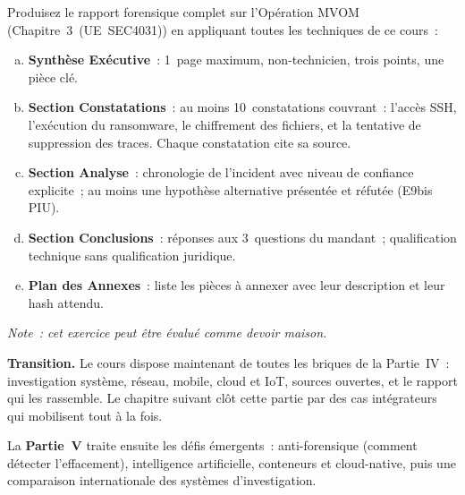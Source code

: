 \begin{boxexo}[title={\ding{45}\quad Exercice~20.3. Rapport complet \niveauexpert}]
Produisez le rapport forensique complet sur l'Opération MVOM
(Chapitre~3~(UE~SEC4031)) en appliquant toutes les
techniques de ce cours~:
\begin{enumerate}[(a)]
    \item \textbf{Synthèse Exécutive}~: 1~page maximum,
          non-technicien, trois points, une pièce clé.
    \item \textbf{Section Constatations}~: au moins 10~constatations
          couvrant~: l'accès SSH, l'exécution du ransomware,
          le chiffrement des fichiers, et la tentative de suppression
          des traces. Chaque constatation cite sa source.
    \item \textbf{Section Analyse}~: chronologie de l'incident avec
          niveau de confiance explicite~; au moins une hypothèse
          alternative présentée et réfutée (E9bis PIU).
    \item \textbf{Section Conclusions}~: réponses aux 3~questions
          du mandant~; qualification technique sans qualification
          juridique.
    \item \textbf{Plan des Annexes}~: liste les pièces à annexer
          avec leur description et leur hash attendu.
\end{enumerate}
\textit{Note~: cet exercice peut être évalué comme devoir maison.}
\end{boxexo}

\bigskip

\begin{boxinfo}
\textbf{Transition.} Le cours dispose maintenant de toutes les
briques de la Partie~IV~: investigation système, réseau, mobile,
cloud et IoT, sources ouvertes, et le rapport qui les rassemble.
Le chapitre suivant clôt cette partie par des cas intégrateurs qui
mobilisent tout à la fois.

La \textbf{Partie~V} traite ensuite les défis émergents~:
anti-forensique (comment détecter l'effacement), intelligence
artificielle, conteneurs et cloud-native, puis une comparaison
internationale des systèmes d'investigation.
\end{boxinfo}
